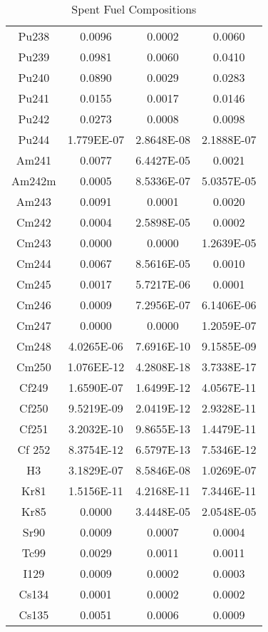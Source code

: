 \begin{table}[h!]
{\begin{tabular}{cccc}
Pu238    &      0.0096&         0.0002 &        0.0060 \\
Pu239    &      0.0981&         0.0060 &        0.0410 \\
Pu240    &      0.0890&         0.0029 &        0.0283 \\
Pu241    &      0.0155&         0.0017 &        0.0146 \\
Pu242    &      0.0273&         0.0008 &        0.0098 \\
Pu244    &      1.779EE-07&     2.8648E-08 &    2.1888E-07 \\
Am241    &      0.0077&         6.4427E-05 &    0.0021 \\
Am242m   &      0.0005&         8.5336E-07 &    5.0357E-05 \\
Am243    &      0.0091&         0.0001 &        0.0020 \\
Cm242    &      0.0004&         2.5898E-05 &    0.0002 \\
Cm243    &      0.0000&         0.0000 &        1.2639E-05 \\
Cm244    &      0.0067&         8.5616E-05 &    0.0010 \\
Cm245    &      0.0017&         5.7217E-06 &    0.0001 \\
Cm246    &      0.0009&         7.2956E-07 &    6.1406E-06 \\
Cm247    &      0.0000&         0.0000 &        1.2059E-07 \\
Cm248    &      4.0265E-06&     7.6916E-10 &    9.1585E-09 \\
Cm250    &      1.076EE-12&     4.2808E-18 &    3.7338E-17 \\
Cf249    &      1.6590E-07&     1.6499E-12 &    4.0567E-11 \\
Cf250    &      9.5219E-09&     2.0419E-12 &    2.9328E-11 \\
Cf251    &      3.2032E-10&     9.8655E-13 &    1.4479E-11 \\
Cf 252   &      8.3754E-12&     6.5797E-13 &    7.5346E-12 \\
H3       &      3.1829E-07&     8.5846E-08 &    1.0269E-07 \\
Kr81     &      1.5156E-11&     4.2168E-11 &    7.3446E-11 \\
Kr85     &      0.0000&         3.4448E-05 &    2.0548E-05 \\
Sr90     &      0.0009&         0.0007 &        0.0004 \\
Tc99     &      0.0029&         0.0011 &        0.0011 \\
I129     &      0.0009&         0.0002 &        0.0003 \\
Cs134    &      0.0001&         0.0002 &        0.0002 \\
Cs135    &      0.0051&         0.0006 &        0.0009 \\
\hline
                \end{tabular}}
                \caption{Spent Fuel Compositions}
                \label{tab:comp}
\end{table}
